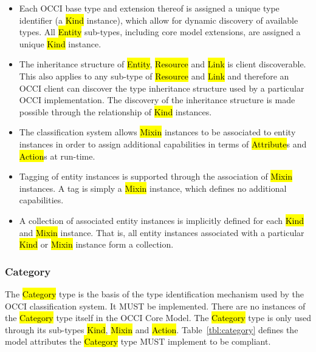 \documentclass[10pt,a4paper]{article}
\begin{document}
\begin{itemize}
  \item Each OCCI base type and extension thereof is assigned a unique
    type identifier (a \hl{Kind} instance), which allow for dynamic
    discovery of available types. All \hl{Entity} sub-types, including
    core model extensions, are assigned a unique \hl{Kind} instance.

  \item The inheritance structure of \hl{Entity}, \hl{Resource} and
    \hl{Link} is client discoverable. This also applies to any
    sub-type of \hl{Resource} and \hl{Link} and therefore an OCCI
    client can discover the type inheritance structure used by a
    particular OCCI implementation. The discovery of the inheritance
    structure is made possible through the relationship of \hl{Kind}
    instances.

  \item The classification system allows \hl{Mixin} instances to be
    associated to entity instances in order to assign additional
    capabilities in terms of \hl{Attribute}s and \hl{Action}s at
    run-time.

  \item Tagging of entity instances is supported through the
    association of \hl{Mixin} instances. A tag is simply a \hl{Mixin}
    instance, which defines no additional capabilities.

  \item A collection of associated entity instances is implicitly
    defined for each \hl{Kind} and \hl{Mixin} instance. That is, all
    entity instances associated with a particular \hl{Kind} or
    \hl{Mixin} instance form a collection.
\end{itemize}

\subsubsection{Category}
\label{sec:category}
The \hl{Category} type is the basis of the type identification
mechanism used by the OCCI classification system. It MUST be
implemented.
There are no instances of the \hl{Category} type itself in the OCCI Core Model.
The \hl{Category} type is only used through its sub-types \hl{Kind}, \hl{Mixin}
and \hl{Action}.
%
Table~\ref{tbl:category} defines the model attributes the \hl{Category} type
MUST implement to be compliant.
\end{document}
